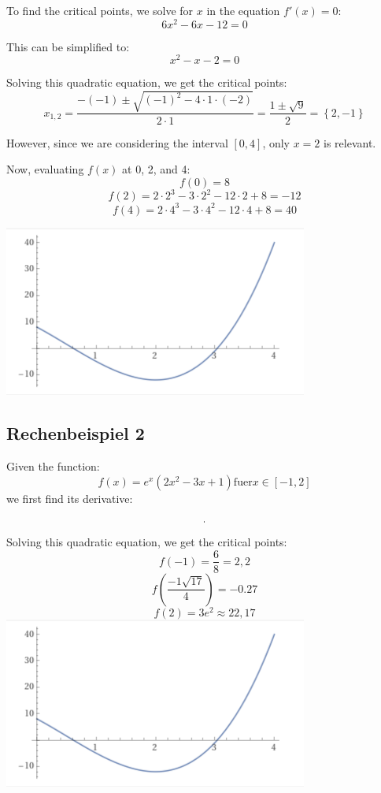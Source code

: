 \documentclass{article}
\theoremstyle{mytheoremstyle}
\theoremstyle{mytheoremstyle}
\theoremstyle{myproblemstyle}
\begin{document}
To find the critical points, we solve for \(x\) in the equation \(f'(x) = 0\):
\[ 6x^2 - 6x - 12 = 0 \]

This can be simplified to:
\[ x^2 - x - 2 = 0 \]

Solving this quadratic equation, we get the critical points:
\[ x_{1,2} = \frac{-(-1) \pm \sqrt{(-1)^2 - 4 \cdot 1 \cdot (-2)}}{2 \cdot 1} = \frac{1 \pm \sqrt{9}}{2} = \left\{ 2, -1 \right\} \]

However, since we are considering the interval \([0,4]\), only \(x = 2\) is relevant.

Now, evaluating \(f(x)\) at 0, 2, and 4:
\[ f(0) = 8 \]
\[ f(2) = 2 \cdot 2^3 - 3 \cdot 2^2 - 12 \cdot 2 + 8 = -12 \]
\[ f(4) = 2 \cdot 4^3 - 3 \cdot 4^2 - 12 \cdot 4 + 8 = 40 \]

\includegraphics[width=10cm]{img/Bildschirmfoto 2023-11-28 um 9.15.57 AM.png}

\subsection{Rechenbeispiel 2}
Given the function:
\[f(x) = e^x (2x^2 - 3 x + 1) \text{fuer} x \in [-1,2]\]
we first find its derivative:
\[\ldotp\]
Solving this quadratic equation, we get the critical points:
\[f(-1) = \frac{6}{8} = 2,2\]
\[f(\frac{-1 \sqrt{17}}{4}) = -0.27\]
\[f(2) = 3 e ^ {2} \approx 22,17\]
\includegraphics[width = 10cm]{img/Bildschirmfoto 2023-11-28 um 9.15.57 AM.png}
\end{document}
